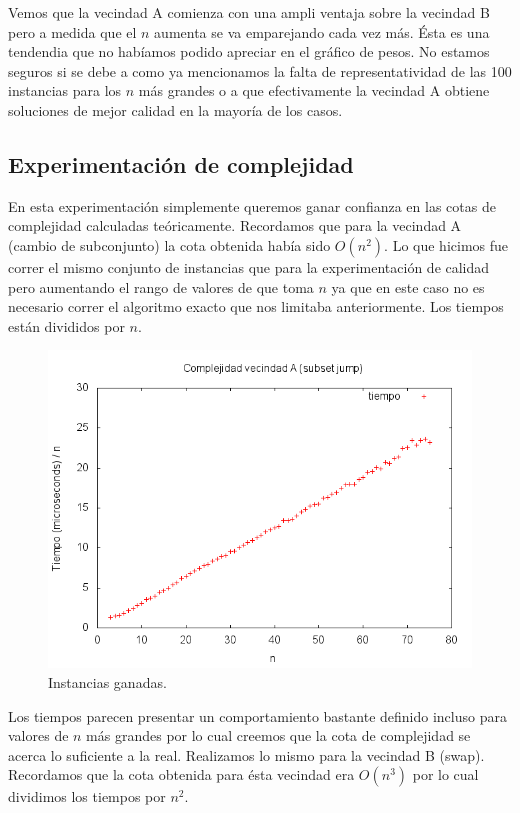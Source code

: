 Vemos que la vecindad A comienza con una ampli ventaja sobre la vecindad B pero a medida que el $n$ aumenta
se va emparejando cada vez más. Ésta es una tendendia que no habíamos podido apreciar en el gráfico de pesos.
No estamos seguros si se debe a como ya mencionamos la falta de representatividad de las 100 instancias para
los $n$ más grandes o a que efectivamente la vecindad A obtiene soluciones de mejor calidad en la mayoría de los
casos.

\subsection{Experimentación de complejidad}
En esta experimentación simplemente queremos ganar confianza en las cotas de complejidad
calculadas teóricamente. Recordamos que para la vecindad A (cambio de subconjunto) la cota obtenida
había sido $O(n^2)$. Lo que hicimos fue correr el mismo conjunto de instancias que para la experimentación
de calidad pero aumentando el rango de valores de que toma $n$ ya que en este caso no es necesario correr
el algoritmo exacto que nos limitaba anteriormente. Los tiempos están divididos por $n$.

\begin{figure}[H]
		\centering
		\includegraphics[width=\textwidth]{tiempos_vecindad_a.png}
		\caption{Instancias ganadas.}
		\label{fig:ej3_ejemplo}
\end{figure}

Los tiempos parecen presentar un comportamiento bastante definido incluso para valores de $n$ más grandes
por lo cual creemos que la cota de complejidad se acerca lo suficiente a la real.
Realizamos lo mismo para la vecindad B (swap). Recordamos que la cota obtenida para ésta vecindad era $O(n^3)$
por lo cual dividimos los tiempos por $n^2$.

